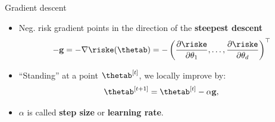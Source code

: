 
\begin{vbframe}{Gradient descent}
  \begin{itemize}
    \item Neg. risk gradient points in the direction of the \textbf{steepest descent}
    $$
    - \mathbf{g} = - \nabla \riske(\thetab) = - \left(\frac{\partial \riske}{\partial \theta_1}, \ldots, \frac{\partial \riske}{\partial \theta_d}\right)^\top
    $$ 

    \item \enquote{Standing} at a point $\thetab^{[t]}$, we locally improve by:
    $$
      \thetab^{[t + 1 ]}  = \thetab^{[t]} - \alpha \mathbf{g},
    $$
    \item $\alpha$ is called \textbf{step size} or \textbf{learning rate}.
  \end{itemize}



\begin{figure}
\centering
{}
\end{figure}
\end{vbframe}
